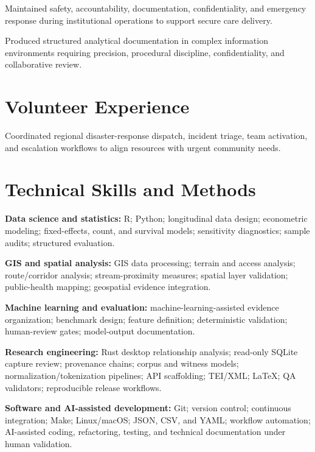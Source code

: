 \documentclass[10.5pt,letterpaper]{article}
\begin{document}
\begin{cvbullets}
    \item Maintained safety, accountability, documentation, confidentiality, and emergency response during institutional operations to support secure care delivery.
\end{cvbullets}

\begin{cvbullets}
    \item Produced structured analytical documentation in complex information environments requiring precision, procedural discipline, confidentiality, and collaborative review.
\end{cvbullets}

\section*{Volunteer Experience}
\begin{cvbullets}
    \item Coordinated regional disaster-response dispatch, incident triage, team activation, and escalation workflows to align resources with urgent community needs.
\end{cvbullets}

\section*{Technical Skills and Methods}
\begin{cvbullets}
    \item \textbf{Data science and statistics:} R; Python; longitudinal data design; econometric modeling; fixed-effects, count, and survival models; sensitivity diagnostics; sample audits; structured evaluation.
    \item \textbf{GIS and spatial analysis:} GIS data processing; terrain and access analysis; route/corridor analysis; stream-proximity measures; spatial layer validation; public-health mapping; geospatial evidence integration.
    \item \textbf{Machine learning and evaluation:} machine-learning-assisted evidence organization; benchmark design; feature definition; deterministic validation; human-review gates; model-output documentation.
    \item \textbf{Research engineering:} Rust desktop relationship analysis; read-only SQLite capture review; provenance chains; corpus and witness models; normalization/tokenization pipelines; API scaffolding; TEI/XML; LaTeX; QA validators; reproducible release workflows.
    \item \textbf{Software and AI-assisted development:} Git; version control; continuous integration; Make; Linux/macOS; JSON, CSV, and YAML; workflow automation; AI-assisted coding, refactoring, testing, and technical documentation under human validation.
\end{cvbullets}
\end{document}
